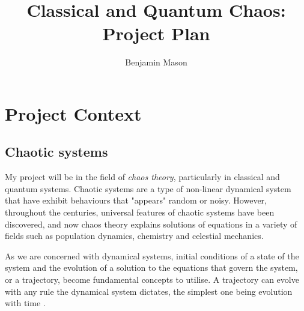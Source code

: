 \documentclass[12pt,a4paper]{amsart}
\title{Classical and Quantum Chaos: Project Plan}
\author{Benjamin Mason}
\begin{document}
\maketitle









\section{Project Context}

\subsection{Chaotic systems}
My project will be in the field of \textit{chaos theory}, particularly in classical and quantum systems. Chaotic systems are a type of non-linear dynamical system that have exhibit behaviours that "appears" random or noisy. However, throughout the centuries, universal features of chaotic systems have been discovered, and now chaos theory explains solutions of equations in a variety of fields such as population dynamics, chemistry and celestial mechanics.

As we are concerned with dynamical systems, initial conditions of a state of the system and the evolution of a solution to the equations that govern the system, or a trajectory, become fundamental concepts to utilise. A trajectory can evolve with any rule the dynamical system dictates, the simplest one being evolution with time \cite{HILBORN}.
\end{document}
